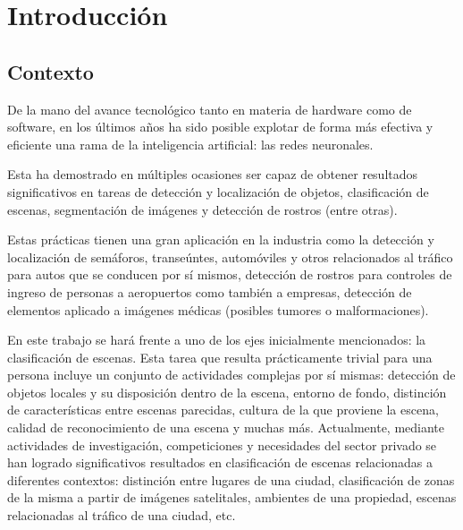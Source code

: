 
\section{Introducción}
\subsection{Contexto}
De la mano del avance tecnológico tanto en materia de hardware como de software, en los últimos años ha sido posible explotar de forma más efectiva y eficiente una rama de la inteligencia artificial: las redes neuronales.


Esta ha demostrado en múltiples ocasiones ser capaz de obtener resultados significativos en tareas de detección y localización de objetos, clasificación de escenas, segmentación de imágenes y detección de rostros (entre otras). 



Estas prácticas tienen una gran aplicación en la industria como la detección y localización de semáforos, transeúntes, automóviles y otros relacionados al tráfico para autos que se conducen por sí mismos, detección de rostros para controles de ingreso de personas a aeropuertos como también a empresas, detección de elementos aplicado a imágenes médicas (posibles tumores o malformaciones).



En este trabajo se hará frente a uno de los ejes inicialmente mencionados: la clasificación de escenas. Esta tarea que resulta prácticamente trivial para una persona incluye un conjunto de actividades complejas por sí mismas: detección de objetos locales y su disposición dentro de la escena, entorno de fondo, distinción de características entre escenas parecidas, cultura de la que proviene la escena, calidad de reconocimiento de una escena y muchas más. Actualmente, mediante actividades de investigación, competiciones y necesidades del sector privado se han logrado significativos resultados en clasificación de escenas relacionadas a diferentes contextos: distinción entre lugares de una ciudad, clasificación de zonas de la misma a partir de imágenes satelitales, ambientes de una propiedad, escenas relacionadas al tráfico de una ciudad, etc.

